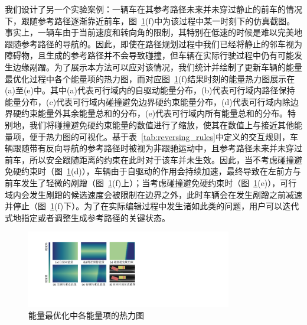 我们设计了另一个实验案例：一辆车在其参考路径未来并未穿过静止的前车的情况下，跟随参考路径逐渐靠近前车，图~\ref{fig:reversing_heatmap}(f)中为该过程中某一时刻下的仿真截图。事实上，一辆车由于当前速度和转向角的限制，其特别在低速的时候是难以完美地跟随参考路径的导航的。因此，即使在路径规划过程中我们已经将静止的邻车视为障碍物，且生成的参考路径并不会导致碰撞，但车辆在实际行驶过程中仍有可能发生边缘剐蹭。为了展示本方法可以应对该情况，我们统计并绘制了更新车辆的能量最优化过程中各个能量项的热力图，而对应图~\ref{fig:reversing_heatmap}(f)结果时刻的能量热力图展示在(a)至(e)中。其中(a)代表可行域内的自驱动能量分布，(b)代表可行域内路径保持能量分布，(c)代表可行域内碰撞避免边界硬约束能量分布，(d)代表可行域内除边界硬约束能量外其余能量总和的分布，(e)代表可行域内所有能量总和的分布。特别地，我们将碰撞避免硬约束能量的数值进行了缩放，使其在数值上与接近其他能量项，便于热力图的可视化。基于表~\ref{tab:reversing_rules}中定义的交互规则，车辆跟随带有反向导航的参考路径时被视为非跟驰运动中，且参考路径未来并未穿过前车，所以安全跟随距离的约束在此时对于该车并未生效。因此，当不考虑碰撞避免硬约束时（图~\ref{fig:reversing_heatmap}(d)），车辆由于自驱动的作用会持续加速，最终导致在左前方与前车发生了轻微的剐蹭（图~\ref{fig:reversing_heatmap}(f)上）；当考虑碰撞避免硬约束时（图~\ref{fig:reversing_heatmap}(e)），可行域内会发生剐蹭的候选速度会被限制在边界之外，此时车辆会在发生剐蹭之前减速并停止（图~\ref{fig:reversing_heatmap}(f)下）。为了在实际编辑过程中发生诸如此类的问题，用户可以迭代式地指定或者调整生成参考路径的关键状态。



\begin{figure}[!tbh]
\centering
\includegraphics[width=0.8\textwidth]{figure/reversing/heatmap v4.pdf}
\caption[能量最优化中各能量项的热力图]{
能量最优化中各能量项的热力图
}
\label{fig:reversing_heatmap}
\end{figure}


